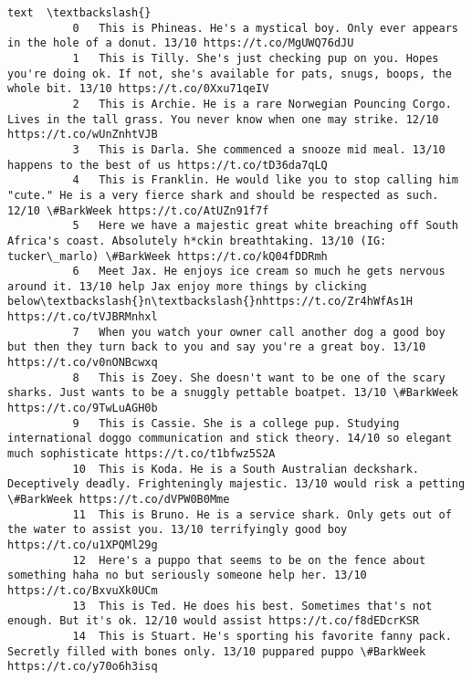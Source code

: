 \documentclass[11pt]{article}
\begin{document}
\begin{Verbatim}[commandchars=\\\{\}]
                                                                                                                                                                                text  \textbackslash{}
          0   This is Phineas. He's a mystical boy. Only ever appears in the hole of a donut. 13/10 https://t.co/MgUWQ76dJU                                                            
          1   This is Tilly. She's just checking pup on you. Hopes you're doing ok. If not, she's available for pats, snugs, boops, the whole bit. 13/10 https://t.co/0Xxu71qeIV       
          2   This is Archie. He is a rare Norwegian Pouncing Corgo. Lives in the tall grass. You never know when one may strike. 12/10 https://t.co/wUnZnhtVJB                        
          3   This is Darla. She commenced a snooze mid meal. 13/10 happens to the best of us https://t.co/tD36da7qLQ                                                                  
          4   This is Franklin. He would like you to stop calling him "cute." He is a very fierce shark and should be respected as such. 12/10 \#BarkWeek https://t.co/AtUZn91f7f       
          5   Here we have a majestic great white breaching off South Africa's coast. Absolutely h*ckin breathtaking. 13/10 (IG: tucker\_marlo) \#BarkWeek https://t.co/kQ04fDDRmh       
          6   Meet Jax. He enjoys ice cream so much he gets nervous around it. 13/10 help Jax enjoy more things by clicking below\textbackslash{}n\textbackslash{}nhttps://t.co/Zr4hWfAs1H https://t.co/tVJBRMnhxl   
          7   When you watch your owner call another dog a good boy but then they turn back to you and say you're a great boy. 13/10 https://t.co/v0nONBcwxq                           
          8   This is Zoey. She doesn't want to be one of the scary sharks. Just wants to be a snuggly pettable boatpet. 13/10 \#BarkWeek https://t.co/9TwLuAGH0b                       
          9   This is Cassie. She is a college pup. Studying international doggo communication and stick theory. 14/10 so elegant much sophisticate https://t.co/t1bfwz5S2A            
          10  This is Koda. He is a South Australian deckshark. Deceptively deadly. Frighteningly majestic. 13/10 would risk a petting \#BarkWeek https://t.co/dVPW0B0Mme               
          11  This is Bruno. He is a service shark. Only gets out of the water to assist you. 13/10 terrifyingly good boy https://t.co/u1XPQMl29g                                      
          12  Here's a puppo that seems to be on the fence about something haha no but seriously someone help her. 13/10 https://t.co/BxvuXk0UCm                                       
          13  This is Ted. He does his best. Sometimes that's not enough. But it's ok. 12/10 would assist https://t.co/f8dEDcrKSR                                                      
          14  This is Stuart. He's sporting his favorite fanny pack. Secretly filled with bones only. 13/10 puppared puppo \#BarkWeek https://t.co/y70o6h3isq                           
          

\end{Verbatim}
\end{document}

